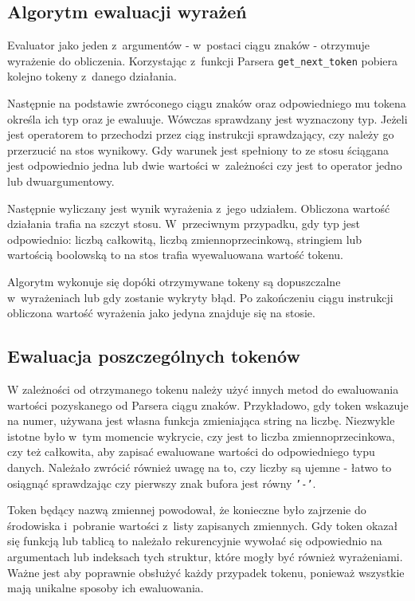 \documentclass[shortabstract]{iithesis}
\begin{document}
\subsection{Algorytm ewaluacji wyrażeń}
Evaluator jako jeden z~argumentów - w~postaci ciągu znaków - otrzymuje wyrażenie do obliczenia. Korzystając z~funkcji Parsera \texttt{get\_next\_token} pobiera kolejno tokeny z~danego działania.

Następnie na podstawie zwróconego ciągu znaków oraz odpowiedniego mu tokena określa ich typ oraz je ewaluuje. Wówczas sprawdzany jest wyznaczony typ. Jeżeli jest operatorem to przechodzi przez ciąg instrukcji sprawdzający, czy należy go przerzucić na stos wynikowy. Gdy warunek jest spełniony to ze stosu ściągana jest odpowiednio jedna lub dwie wartości w~zależności czy jest to operator jedno lub dwuargumentowy.

Następnie wyliczany jest wynik wyrażenia z~jego udziałem. Obliczona wartość działania trafia na szczyt stosu. W~przeciwnym przypadku, gdy typ jest odpowiednio: liczbą całkowitą, liczbą zmiennoprzecinkową, stringiem lub wartością boolowską to na stos trafia wyewaluowana wartość tokenu.

Algorytm wykonuje się dopóki otrzymywane tokeny są dopuszczalne w~wyrażeniach lub gdy zostanie wykryty błąd. Po zakończeniu ciągu instrukcji obliczona wartość wyrażenia jako jedyna znajduje się na stosie.

\subsection{Ewaluacja poszczególnych tokenów}
W zależności od otrzymanego tokenu należy użyć innych metod do ewaluowania wartości pozyskanego od Parsera ciągu znaków. Przykładowo, gdy token wskazuje na numer, używana jest własna funkcja zmieniająca string na liczbę. Niezwykle istotne było w~tym momencie wykrycie, czy jest to liczba zmiennoprzecinkowa, czy też całkowita, aby zapisać ewaluowane wartości do odpowiedniego typu danych. Należało zwrócić również uwagę na to, czy liczby są ujemne - łatwo to osiągnąć sprawdzając czy pierwszy znak bufora jest równy \texttt{'-'}.

Token będący nazwą zmiennej powodował, że konieczne było zajrzenie do środowiska i~pobranie wartości z~listy zapisanych zmiennych. Gdy token okazał się funkcją lub tablicą to należało rekurencyjnie wywołać się odpowiednio na argumentach lub indeksach tych struktur, które mogły być również wyrażeniami. Ważne jest aby poprawnie obsłużyć każdy przypadek tokenu, ponieważ wszystkie mają unikalne sposoby ich ewaluowania.
\end{document}

